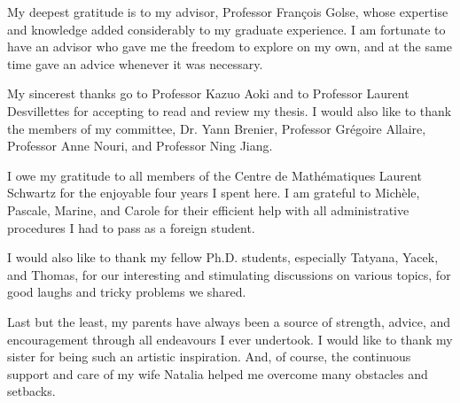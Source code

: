 My deepest gratitude is to my advisor, Professor François Golse, whose expertise and knowledge added considerably to my graduate experience. I am fortunate to have an advisor who gave me the freedom to explore on my own, and at the same time gave an advice whenever it was necessary.

My sincerest thanks go to Professor Kazuo Aoki and to Professor Laurent Desvillettes for accepting to read and review my thesis. I would also like to thank the members of my committee, Dr. Yann Brenier, Professor Grégoire Allaire, Professor Anne Nouri, and Professor Ning Jiang.

I owe my gratitude to all members of the Centre de Mathématiques Laurent Schwartz for the enjoyable four years I spent here. I am grateful to Michèle, Pascale, Marine, and Carole for their efficient help with all administrative procedures I had to pass as a foreign student.

I would also like to thank my fellow Ph.D. students, especially Tatyana, Yacek, and Thomas, for our interesting and stimulating discussions on various topics, for good laughs and tricky problems we shared.

Last but the least, my parents have always been a source of strength, advice, and encouragement through all endeavours I ever undertook. I would like to thank my sister for being such an artistic inspiration. And, of course, the continuous support and care of my wife Natalia helped me overcome many obstacles and setbacks.
